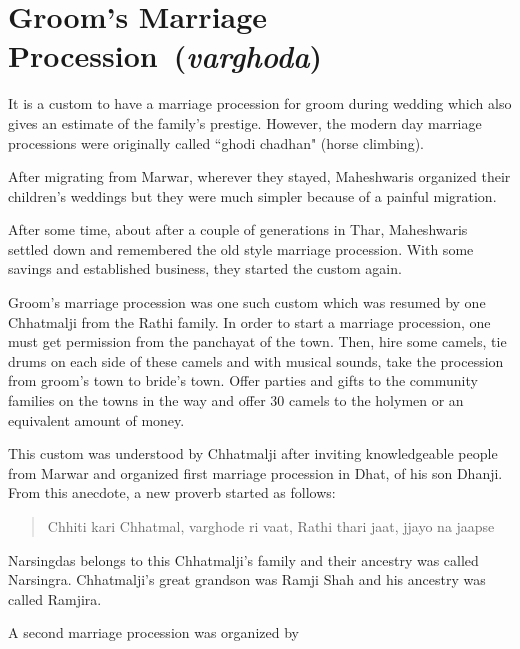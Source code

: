\chapter{Groom's Marriage Procession~(\textit{varghoda})}
It is a custom to have a marriage procession for groom during wedding which also gives an estimate of the family's prestige. However, the modern day marriage processions were originally called ``ghodi chadhan" (horse climbing).

After migrating from Marwar, wherever they stayed, Maheshwaris organized their children's weddings but they were much simpler because of a painful migration.

After some time, about after a couple of generations in Thar, Maheshwaris settled down and remembered the old style marriage procession. With some savings and established business, they started the custom again.

Groom's marriage procession was one such custom which was resumed by one Chhatmalji from the Rathi family. In order to start a marriage procession, one must get permission from the panchayat of the town. Then, hire some camels, tie drums on each side of these camels and with musical sounds, take the procession from groom's town to bride's town. Offer parties and gifts to the community families on the towns in the way and offer 30 camels to the holymen or an equivalent amount of money.

This custom was understood by Chhatmalji after inviting knowledgeable people from Marwar and organized first marriage procession in Dhat, of his son Dhanji. From this anecdote, a new proverb started as follows:
\begin{quote}
Chhiti kari Chhatmal, varghode ri vaat,
Rathi thari jaat, jjayo na jaapse
\end{quote}

Narsingdas belongs to this Chhatmalji's family and their ancestry was called Narsingra. Chhatmalji's great grandson was Ramji Shah and his ancestry was called Ramjira.

A second marriage procession was organized by 
